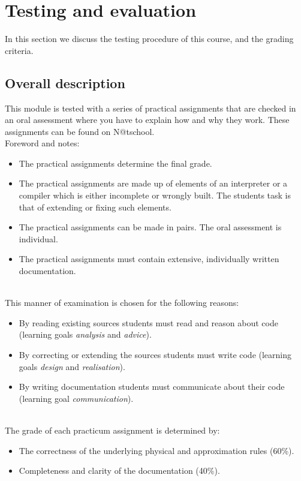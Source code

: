 \section{Testing and evaluation}
	In this section we discuss the testing procedure of this course, and the grading criteria.
	
	\subsection{Overall description}
		
		This module is tested with a series of practical assignments that are checked in an oral assessment where you have to explain how and why they work. These assignments can be found on N@tschool. \\

		Foreword and notes:
		\begin{itemize}
			\item The practical assignments determine the final grade.
			\item The practical assignments are made up of elements of an interpreter or a compiler which is either incomplete or wrongly built. The students task is that of extending or fixing such elements.
			\item The practical assignments can be made in pairs. The oral assessment is individual.
			\item The practical assignments must contain extensive, individually written documentation.
		\end{itemize}
		\ \\
		
		This manner of examination is chosen for the following reasons:
		\begin{itemize}
			\item By reading existing sources students must read and reason about code (learning goals \textit{analysis} and \textit{advice}).
			\item By correcting or extending the sources students must write code (learning goals \textit{design} and \textit{realisation}).
			\item By writing documentation students must communicate about their code (learning goal \textit{communication}).
		\end{itemize}

		\ \\
		The grade of each practicum assignment is determined by:
		\begin{itemize}
			\item The correctness of the underlying physical and approximation rules (60\%).
			\item Completeness and clarity of the documentation (40\%).
		\end{itemize}

